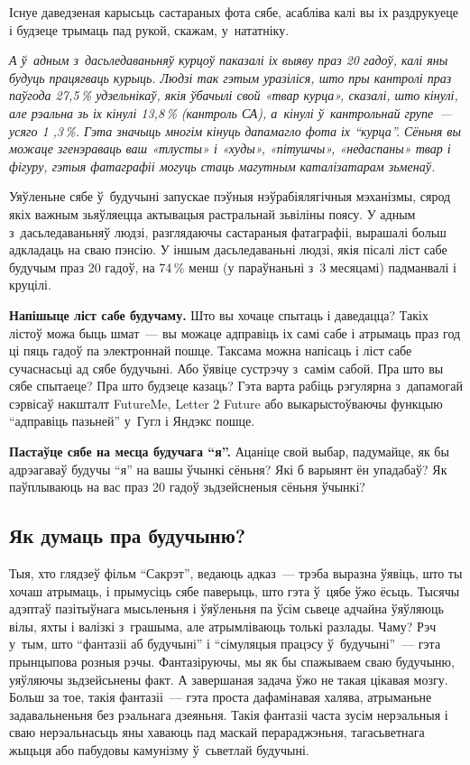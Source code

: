Існуе даведзеная карысьць састараных фота сябе, асабліва калі вы іх раздрукуеце і будзеце трымаць пад рукой, скажам, у~нататніку.

\emph{А ў~адным з~дасьледаваньняў курцоў паказалі іх выяву праз 20 гадоў, калі яны будуць працягваць курыць. Людзі так гэтым уразіліся, што пры кантролі праз паўгода 27,5\,\% удзельнікаў, якія ўбачылі свой «твар курца», сказалі, што кінулі, але рэальна зь іх кінулі 13,8\,\% (кантроль СА), а~кінулі ў~кантрольнай групе~--- усяго 1 ,3\,\%. Гэта значыць многім кінуць дапамагло фота іх ``курца''. Сёньня вы можаце згенэраваць ваш «тлусты» і «худы», «пітушчы», «недаспаны» твар і фігуру, гэтыя фатаграфіі могуць стаць магутным каталізатарам зьменаў.}

Уяўленьне сябе ў~будучыні запускае пэўныя нэўрабіялягічныя мэханізмы, сярод якіх важным зьяўляецца актывацыя растральнай зьвіліны поясу. У адным з~дасьледаваньняў людзі, разглядаючы састараныя фатаграфіі, вырашалі больш адкладаць на сваю пэнсію. У іншым дасьледаваньні людзі, якія пісалі ліст сабе будучым праз 20 гадоў, на 74\,\% менш (у параўнаньні з~3 месяцамі) падманвалі і круцілі.


\textbf{Напішыце ліст сабе будучаму.} Што вы хочаце спытаць і даведацца? Такіх лістоў можа быць шмат~--- вы можаце адправіць іх самі сабе і атрымаць праз год ці пяць гадоў па электроннай пошце. Таксама можна напісаць і ліст сабе сучаснасьці ад сябе будучыні. Або ўявіце сустрэчу з~самім сабой. Пра што вы сябе спытаеце? Пра што будзеце казаць? Гэта варта рабіць рэгулярна з~дапамогай сэрвісаў накшталт FutureMe, Letter 2 Future або выкарыстоўваючы функцыю ``адправіць пазьней'' у~Гугл і Яндэкс пошце.

\textbf{Пастаўце сябе на месца будучага ``я''.} Ацаніце свой выбар, падумайце, як бы адрэагаваў будучы ``я'' на вашы ўчынкі сёньня? Які б варыянт ён упадабаў? Як паўплываюць на вас праз 20 гадоў зьдзейсненыя сёньня ўчынкі?

\subsection*{Як думаць пра будучыню?}

Тыя, хто глядзеў фільм ``Сакрэт'', ведаюць адказ~--- трэба выразна ўявіць, што ты хочаш атрымаць, і прымусіць сябе паверыць, што гэта ў~цябе ўжо ёсьць. Тысячы адэптаў пазітыўнага мысьленьня і ўяўленьня па ўсім сьвеце адчайна ўяўляюць вілы, яхты і валізкі з~грашыма, але атрымліваюць толькі разлады. Чаму? Рэч у~тым, што ``фантазіі аб будучыні'' і ``сімуляцыя працэсу ў~будучыні''~--- гэта прынцыпова розныя рэчы. Фантазіруючы, мы як бы спажываем сваю будучыню, уяўляючы зьдзейсьнены факт. А завершаная задача ўжо не такая цікавая мозгу. Больш за тое, такія фантазіі~--- гэта проста дафамінавая халява, атрыманьне задавальненьня без рэальнага дзеяньня. Такія фантазіі часта зусім нерэальныя і сваю нерэальнасьць яны хаваюць пад маскай перараджэньня, тагасьветнага жыцьця або пабудовы камунізму ў~сьветлай будучыні.

